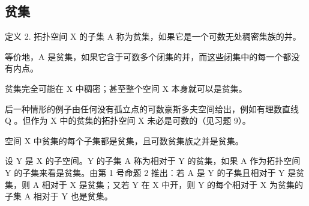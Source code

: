 \subsection{贫集}

定义 2. 拓扑空间 X 的子集 A 称为贫集，如果它是一个可数无处稠密集族的并。

等价地，A 是贫集，如果它含于可数多个闭集的并，而这些闭集中的每一个都没有内点。

贫集完全可能在 X 中稠密；甚至整个空间 X 本身就可以是贫集。

后一种情形的例子由任何没有孤立点的可数豪斯多夫空间给出，例如有理数直线 Q 。但作为 X 中的贫集的拓扑空间 X 未必是可数的（见习题 9）。

空间 X 中贫集的每个子集都是贫集，且可数贫集族之并是贫集。

设 Y 是 X 的子空间。Y 的子集 A 称为相对于 Y 的贫集，如果 A 作为拓扑空间 Y 的子集来看是贫集。由第 1 号命题 2 推出：若 A 是 Y 的子集且相对于 Y 是贫集，则 A 相对于 X 是贫集；又若 Y 在 X 中开，则 Y 的每个相对于 X 为贫集的子集 A 相对于 Y 也是贫集。

